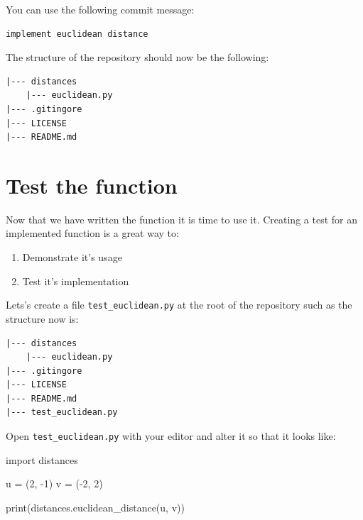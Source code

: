 \documentclass[11pt]{article}
\providecommand{\tightlist}{%
      \setlength{\itemsep}{0pt}\setlength{\parskip}{0pt}}
\newenvironment{Shaded}{}{}
\newcommand{\DecValTok}[1]{\textcolor[rgb]{0.25,0.63,0.44}{{#1}}}
\newcommand{\NormalTok}[1]{{#1}}
\newcommand{\ImportTok}[1]{{#1}}
\newcommand{\OperatorTok}[1]{\textcolor[rgb]{0.40,0.40,0.40}{{#1}}}
\newcommand{\BuiltInTok}[1]{{#1}}
\begin{document}
You can use the following commit message:

\begin{verbatim}
implement euclidean distance
\end{verbatim}

    The structure of the repository should now be the following:

\begin{verbatim}
|--- distances
    |--- euclidean.py
|--- .gitingore
|--- LICENSE   
|--- README.md
\end{verbatim}

    \hypertarget{test-the-function}{%
\section{Test the function}\label{test-the-function}}

    Now that we have written the function it is time to use it. Creating a
test for an implemented function is a great way to:

\begin{enumerate}
\def\labelenumi{\arabic{enumi}.}
\tightlist
\item
  Demonstrate it's usage
\item
  Test it's implementation
\end{enumerate}

Lets's create a file \texttt{test\_euclidean.py} at the root of the
repository such as the structure now is:

\begin{verbatim}
|--- distances
    |--- euclidean.py
|--- .gitingore
|--- LICENSE   
|--- README.md
|--- test_euclidean.py
\end{verbatim}

Open \texttt{test\_euclidean.py} with your editor and alter it so that
it looks like:

\begin{Shaded}
\begin{Highlighting}[]
\ImportTok{import}\NormalTok{ distances}

\NormalTok{u }\OperatorTok{=}\NormalTok{ (}\DecValTok{2}\NormalTok{, }\OperatorTok{{-}}\DecValTok{1}\NormalTok{)}
\NormalTok{v }\OperatorTok{=}\NormalTok{ (}\OperatorTok{{-}}\DecValTok{2}\NormalTok{, }\DecValTok{2}\NormalTok{)}

\BuiltInTok{print}\NormalTok{(distances.euclidean\_distance(u, v))}
\end{Highlighting}
\end{Shaded}
\end{document}

